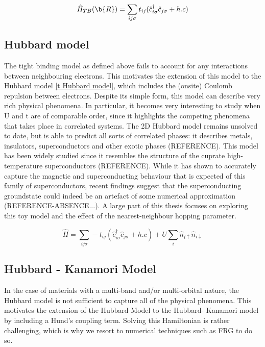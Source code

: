 \documentclass[12pt]{article}
\begin{document}
\begin{equation} \label{TBM}
    \hat{H}_{TB}(\b{R}) = \sum_{ij\sigma} t_{ij}(\hat{c}_{i\sigma}^{\dagger}\hat{c}_{j \sigma} + h.c)
\end{equation}


\subsection{Hubbard model}

The  tight binding model as defined above fails to account for any interactions between neighbouring electrons. This motivates the extension of this model to the Hubbard model \eqref{t Hubbard model}, which includes the (onsite) Coulomb repulsion between electrons. Despite its simple form, this model can describe very rich physical phenomena.
In particular, it becomes very interesting to study when U and t are of comparable order, since it highlights the competing phenomena that takes place in correlated systems. 
The 2D Hubbard model remains unsolved to date, but is able to predict all sorts of correlated phases: it describes metals, insulators, superconductors and other exotic phases (REFERENCE). 
This model has been widely studied since it resembles the structure of the cuprate high-temperature superconductors (REFERENCE). While it has shown to accurately  capture the magnetic and superconducting behaviour that is expected of this family of superconductors, recent findings suggest that the superconducting groundstate 
could indeed be an artefact of some numerical approximation (REFERENCE-ABSENCE...). A large part of this thesis focuses on exploring this toy model and the effect of the nearest-neighbour hopping parameter.



\begin{equation}\label{t Hubbard model}
    \hat{H} = \sum_{ij\sigma} -t_{ij}(\hat{c}_{i\sigma}^{\dagger}\hat{c}_{j \sigma} + h.c) 
    + U \sum_{i} \hat{n}_{i \uparrow} \hat{n}_{i \downarrow}
\end{equation}


\subsection{Hubbard - Kanamori Model}

In the case of materials with a multi-band and/or multi-orbital nature, the Hubbard model is not sufficient to capture all of the physical phenomena. This motivates the extension of the Hubbard Model to the Hubbard- Kanamori model by including a Hund's coupling term.
Solving this Hamiltonian is rather challenging, which is why we resort to numerical techniques such as FRG to do so. 
\end{document}

